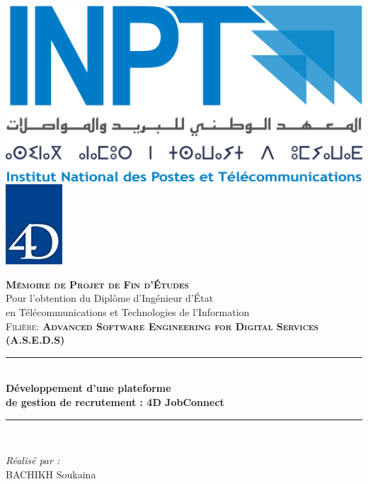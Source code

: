 \begin{titlepage}

\includegraphics[scale=0.11]{Images/logo-inpt.png}
\hspace{10.0cm}
\includegraphics[scale=0.8]{Images/logo-4d.jpg}

\vspace{2cm}


\centering
{\LARGE \textsc{\textbf{Mémoire de Projet de Fin d’Études }}}\\[0.3cm]
{\large Pour l’obtention du Diplôme d’Ingénieur d’État\\ en Télécommunications et Technologies de l’Information }\\[0.3cm]
{ \textsc{Filière: \textbf{Advanced Software Engineering for Digital Services (A.S.E.D.S)} }}\\[0.1cm]
\vspace{1cm}

\rule{\linewidth}{0.4mm} \\[0.6cm] %
{ \huge \textbf{Développement d'une plateforme}\\[0.2cm]\textbf{ de gestion de recrutement : 4D JobConnect
 }} \\[0.8cm]
\rule{\linewidth}{0.4mm} \\[0.4cm]
\vspace{1cm}
\noindent
\begin{minipage}{0.9\textwidth}
    \vspace{-7mm}
  \begin{flushleft} \large
    \emph{Réalisé par :} \\
    \textsc{BACHIKH} Soukaina  \\
    

\end{flushleft}
\end{minipage}
\end{titlepage}
